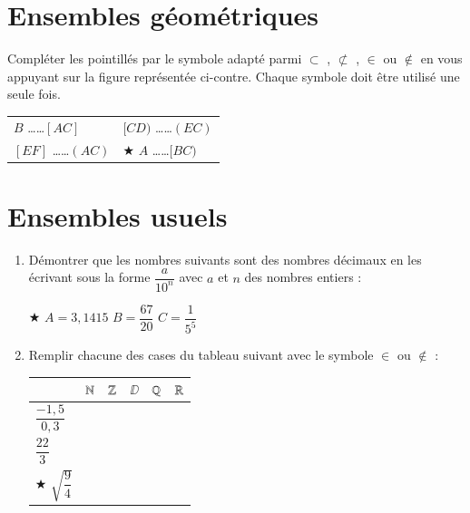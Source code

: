 \documentclass[oneside,12pt]{exam}          %
\begin{document}
\section{Ensembles géométriques}
\begin{minipage}{0.6\textwidth}
	Compléter les pointillés par le symbole adapté parmi $\subset$ , $\not\subset$ , $\in$ ou $\notin$ en vous appuyant sur la figure représentée ci-contre. Chaque symbole doit être utilisé une seule fois.
	
	\renewcommand{\arraystretch}{2}
	\begin{tabular}{P{0.5\textwidth} P{0.5\textwidth}}
		$B$ \ldots\ldots $[AC]$ & $[CD)$ \ldots\ldots $(EC)$ \\
		$[EF]$ \ldots\ldots $(AC)$ & $\bigstar$ $A$ \ldots\ldots $[BC)$
	\end{tabular}
\end{minipage} \hspace{10mm}
\begin{minipage}{0.4\textwidth}
\end{minipage}



\section{Ensembles usuels}
\begin{enumerate}[itemsep = 2mm]
	\item Démontrer que les nombres suivants sont des nombres décimaux en les écrivant sous la forme $\dfrac{a}{10^n}$ avec $a$ et $n$ des nombres entiers :
	
	$\bigstar$ $A = 3,1415$ \hspace{3cm} $B = \dfrac{67}{20}$ \hspace{3cm} $C = \dfrac{1}{5^5}$
	
	\item Remplir chacune des cases du tableau suivant avec le symbole $\in$ ou $\notin$ :

	\begin{center}
		\renewcommand{\arraystretch}{2}
		\begin{tabular}{| P{4cm} || P{2cm} | P{2cm} | P{2cm} | P{2cm} | P{2cm} |} \hline
			 & ${\mathbb N}$ & ${\mathbb Z}$ & $\DD$ & ${\mathbb Q}$ & ${\mathbb R}$ \\ \hline \hline
			$\dfrac{-1,5}{0,3}$ & & & & & \\ \hline
			$\dfrac{22}{3}$ & & & & & \\ \hline
			$\bigstar$ $\sqrt{\dfrac{9}{4}}$ & & & & & \\ \hline
		\end{tabular}
	\end{center}
\end{enumerate}
\end{document}
